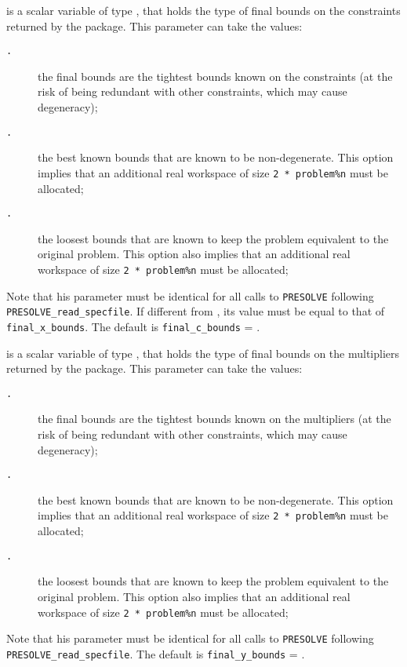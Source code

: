 \documentclass{galahad}
\newcommand{\packagename}{PRESOLVE}
\newcommand{\sym}{\tt\small}
\begin{document}
\begin{description}
 is a scalar variable of type \integer, that
holds the type of final bounds on the constraints returned by
the package.  This parameter can take the values:
\begin{description}
\item[\sym \galsymtightest.] the final bounds are the tightest bounds
                known on the constraints (at the risk of
                being redundant with other constraints,
                which may cause degeneracy);
\item[\sym \galsymnondegenerate.] the best known bounds that are known to
                      be non-degenerate. This option implies
                      that an additional real workspace of size
                      {\tt 2 * problem\%n} must be allocated;
\item[\sym \galsymloosest.] the loosest bounds that are known to
               keep the problem equivalent to the
               original problem. This option also
               implies that an additional real workspace of size
               {\tt 2 * problem\%n} must be allocated;
\end{description}
Note that his parameter must be identical for all calls to
{\tt \packagename} following {\tt \packagename\_read\_specfile}.
If different from {\tt \galsymtightest}, its value must be equal to
that of {\tt final\_x\_bounds}.
The default is {\tt final\_c\_bounds} = {\sym \galsymtightest}.

 is a scalar variable of type \integer, that
holds the type of final bounds on the multipliers returned by
the package.  This parameter can take the values:
\begin{description}
\item[\sym \galsymtightest.] the final bounds are the tightest bounds
                known on the multipliers (at the risk of
                being redundant with other constraints,
                which may cause degeneracy);
\item[\sym \galsymnondegenerate.] the best known bounds that are known to
                      be non-degenerate. This option implies
                      that an additional real workspace of size
                      {\tt 2 * problem\%n} must be allocated;
\item[\sym \galsymloosest.] the loosest bounds that are known to
               keep the problem equivalent to the
               original problem. This option also
               implies that an additional real workspace of size
               {\tt 2 * problem\%n} must be allocated;
\end{description}
Note that his parameter must be identical for all calls to
{\tt \packagename} following {\tt \packagename\_read\_specfile}.
The default is {\tt final\_y\_bounds} = {\sym \galsymtightest}.


\end{description}
\end{document}

